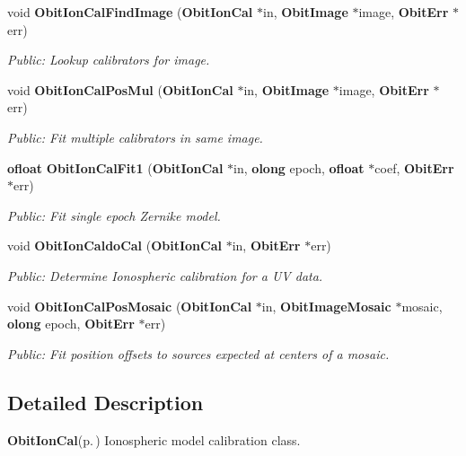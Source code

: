 \begin{CompactItemize}
void {\bf Obit\-Ion\-Cal\-Find\-Image} ({\bf Obit\-Ion\-Cal} $\ast$in, {\bf Obit\-Image} $\ast$image, {\bf Obit\-Err} $\ast$err)
\begin{CompactList}\small\item\em Public: Lookup calibrators for image. \item\end{CompactList}\item 
void {\bf Obit\-Ion\-Cal\-Pos\-Mul} ({\bf Obit\-Ion\-Cal} $\ast$in, {\bf Obit\-Image} $\ast$image, {\bf Obit\-Err} $\ast$err)
\begin{CompactList}\small\item\em Public: Fit multiple calibrators in same image. \item\end{CompactList}\item 
{\bf ofloat} {\bf Obit\-Ion\-Cal\-Fit1} ({\bf Obit\-Ion\-Cal} $\ast$in, {\bf olong} epoch, {\bf ofloat} $\ast$coef, {\bf Obit\-Err} $\ast$err)
\begin{CompactList}\small\item\em Public: Fit single epoch Zernike model. \item\end{CompactList}\item 
void {\bf Obit\-Ion\-Caldo\-Cal} ({\bf Obit\-Ion\-Cal} $\ast$in, {\bf Obit\-Err} $\ast$err)
\begin{CompactList}\small\item\em Public: Determine Ionospheric calibration for a UV data. \item\end{CompactList}\item 
void {\bf Obit\-Ion\-Cal\-Pos\-Mosaic} ({\bf Obit\-Ion\-Cal} $\ast$in, {\bf Obit\-Image\-Mosaic} $\ast$mosaic, {\bf olong} epoch, {\bf Obit\-Err} $\ast$err)
\begin{CompactList}\small\item\em Public: Fit position offsets to sources expected at centers of a mosaic. \item\end{CompactList}\end{CompactItemize}


\subsection{Detailed Description}
{\bf Obit\-Ion\-Cal}{\rm (p.\,\pageref{structObitIonCal})} Ionospheric model calibration class. 

